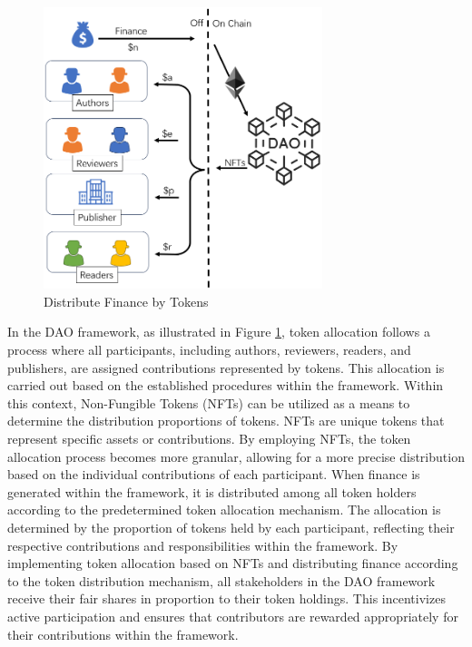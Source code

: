 \documentclass[lettersize,journal]{IEEEtran}
\begin{document}
\begin{figure}[h]
  \centering
  \includegraphics[width=3.2in]{assets/finance.png}
  \caption{Distribute Finance by Tokens}
  \label{fig:frameworkoffinance}
\end{figure}

In the DAO framework, as illustrated in Figure \ref{fig:frameworkoffinance}, token allocation follows a process where all participants, including authors, reviewers, readers, and publishers, are assigned contributions represented by tokens. This allocation is carried out based on the established procedures within the framework.
Within this context, Non-Fungible Tokens (NFTs) can be utilized as a means to determine the distribution proportions of tokens. NFTs are unique tokens that represent specific assets or contributions. By employing NFTs, the token allocation process becomes more granular, allowing for a more precise distribution based on the individual contributions of each participant.
When finance is generated within the framework, it is distributed among all token holders according to the predetermined token allocation mechanism. The allocation is determined by the proportion of tokens held by each participant, reflecting their respective contributions and responsibilities within the framework.
By implementing token allocation based on NFTs and distributing finance according to the token distribution mechanism, all stakeholders in the DAO framework receive their fair shares in proportion to their token holdings. This incentivizes active participation and ensures that contributors are rewarded appropriately for their contributions within the framework.
\end{document}
